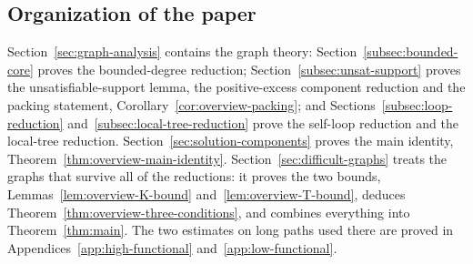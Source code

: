 
\subsection{Organization of the paper}

Section~\ref{sec:graph-analysis} contains the graph theory:
Section~\ref{subsec:bounded-core} proves the bounded-degree reduction;
Section~\ref{subsec:unsat-support} proves the unsatisfiable-support lemma, the
positive-excess component reduction and the packing statement,
Corollary~\ref{cor:overview-packing}; and Sections~\ref{subsec:loop-reduction}
and~\ref{subsec:local-tree-reduction} prove the self-loop reduction and the
local-tree reduction. Section~\ref{sec:solution-components} proves the main
identity, Theorem~\ref{thm:overview-main-identity}.
Section~\ref{sec:difficult-graphs} treats the graphs that survive all of the
reductions: it proves the two bounds,
Lemmas~\ref{lem:overview-K-bound} and~\ref{lem:overview-T-bound}, deduces
Theorem~\ref{thm:overview-three-conditions}, and combines everything into
Theorem~\ref{thm:main}. The two estimates on long paths used there are proved
in Appendices~\ref{app:high-functional} and~\ref{app:low-functional}.
